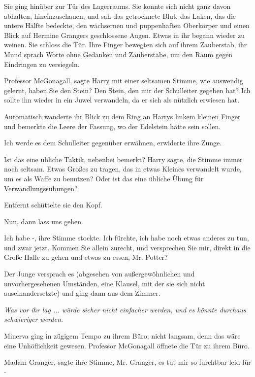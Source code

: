 Sie ging hinüber zur Tür des Lagerraums. Sie konnte sich nicht ganz davon
abhalten, hineinzuschauen, und sah das getrocknete Blut, das Laken, das die
untere Hälfte bedeckte, den wächsernen und puppenhaften Oberkörper und einen
Blick auf Hermine Grangers geschlossene Augen. Etwas in ihr begann wieder zu
weinen. Sie schloss die Tür. Ihre Finger bewegten sich auf ihrem Zauberstab, ihr
Mund sprach Worte ohne Gedanken und Zauberstäbe, um den Raum gegen Eindringen zu
versiegeln.

\glqq{}Professor McGonagall\grqq{}, sagte Harry mit einer seltsamen Stimme, wie
auswendig gelernt, \glqq{}haben Sie den Stein? Den Stein, den mir der Schulleiter
gegeben hat? Ich sollte ihn wieder in ein Juwel verwandeln, da er sich als
nützlich erwiesen hat.\grqq{}

Automatisch wanderte ihr Blick zu dem Ring an Harrys linkem kleinen Finger und
bemerkte die Leere der Fassung, wo der Edelstein hätte sein sollen.

\glqq{}Ich werde es dem Schulleiter gegenüber erwähnen\grqq{}, erwiderte ihre
Zunge.

\glqq{}Ist das eine übliche Taktik, nebenbei bemerkt?\grqq{} Harry sagte, die
Stimme immer noch seltsam. \glqq{}Etwas Großes zu tragen, das in etwas Kleines
verwandelt wurde, um es als Waffe zu benutzen? Oder ist das eine übliche Übung
für Verwandlungssübungen?\grqq{}

Entfernt schüttelte sie den Kopf.

\glqq{}Nun, dann lass uns gehen.\grqq{}

\glqq{}Ich habe -\grqq{}, ihre Stimme stockte. \glqq{}Ich fürchte, ich habe noch
etwas anderes zu tun, und zwar jetzt. Kommen Sie allein zurecht, und versprechen
Sie mir, direkt in die Große Halle zu gehen und etwas zu essen, Mr. Potter?

Der Junge versprach es (abgesehen von außergewöhnlichen und unvorhergesehenen
Umständen, eine Klausel, mit der sie sich nicht auseinandersetzte) und ging dann
aus dem Zimmer.

\emph{Was vor ihr lag ... würde sicher nicht einfacher werden, und es könnte
durchaus schwieriger werden.}

Minerva ging in zügigem Tempo zu ihrem Büro; nicht langsam, denn das wäre eine
Unhöflichkeit gewesen. Professor McGonagall öffnete die Tür zu ihrem Büro.

\glqq{}Madam Granger\grqq{}, sagte ihre Stimme, \glqq{}Mr. Granger, es tut mir so
furchtbar leid für -\grqq{}


